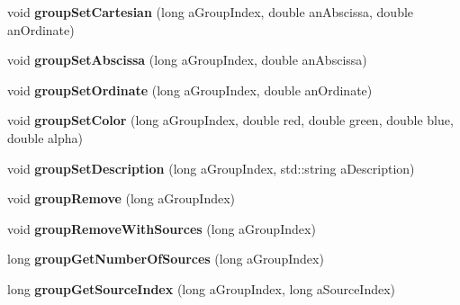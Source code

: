 \begin{DoxyCompactItemize}
\item 
\hypertarget{class_sources_manager_a2fc5f7296a8e14192699bbbe3f1c70d8}{void {\bfseries group\-Set\-Cartesian} (long a\-Group\-Index, double an\-Abscissa, double an\-Ordinate)}\label{class_sources_manager_a2fc5f7296a8e14192699bbbe3f1c70d8}

\item 
\hypertarget{class_sources_manager_a99a9cbe830930c3e85ca8c8105f9abe1}{void {\bfseries group\-Set\-Abscissa} (long a\-Group\-Index, double an\-Abscissa)}\label{class_sources_manager_a99a9cbe830930c3e85ca8c8105f9abe1}

\item 
\hypertarget{class_sources_manager_a3b02d2164f47b6772aca1e7624108ebb}{void {\bfseries group\-Set\-Ordinate} (long a\-Group\-Index, double an\-Ordinate)}\label{class_sources_manager_a3b02d2164f47b6772aca1e7624108ebb}

\item 
\hypertarget{class_sources_manager_a67376a90eb01b64623bdecd9bb244002}{void {\bfseries group\-Set\-Color} (long a\-Group\-Index, double red, double green, double blue, double alpha)}\label{class_sources_manager_a67376a90eb01b64623bdecd9bb244002}

\item 
\hypertarget{class_sources_manager_a99142fce94db50e19bd35a5a96c3c029}{void {\bfseries group\-Set\-Description} (long a\-Group\-Index, std\-::string a\-Description)}\label{class_sources_manager_a99142fce94db50e19bd35a5a96c3c029}

\item 
\hypertarget{class_sources_manager_abfe7cf433475550d10665b9895ff9c70}{void {\bfseries group\-Remove} (long a\-Group\-Index)}\label{class_sources_manager_abfe7cf433475550d10665b9895ff9c70}

\item 
\hypertarget{class_sources_manager_a7585c7a9b362f460cd3dd95d6ad60d0c}{void {\bfseries group\-Remove\-With\-Sources} (long a\-Group\-Index)}\label{class_sources_manager_a7585c7a9b362f460cd3dd95d6ad60d0c}

\item 
\hypertarget{class_sources_manager_a5af5e0ab5fca8421fc7d7d641c72022a}{long {\bfseries group\-Get\-Number\-Of\-Sources} (long a\-Group\-Index)}\label{class_sources_manager_a5af5e0ab5fca8421fc7d7d641c72022a}

\item 
\hypertarget{class_sources_manager_ace9d731e742ff9cf3242b498de429496}{long {\bfseries group\-Get\-Source\-Index} (long a\-Group\-Index, long a\-Source\-Index)}\label{class_sources_manager_ace9d731e742ff9cf3242b498de429496}


\end{DoxyCompactItemize}
